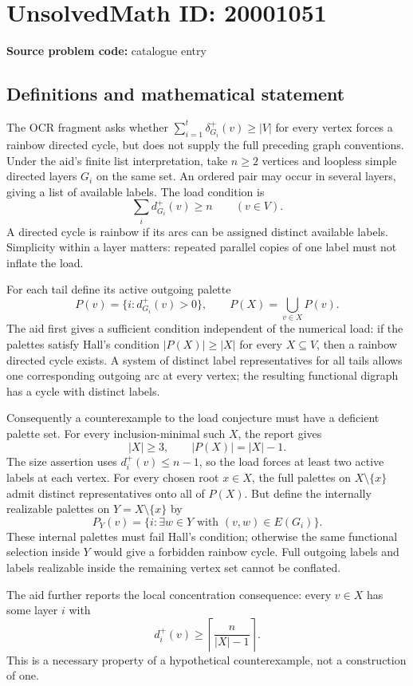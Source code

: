 \documentclass[11pt]{article}
\begin{document}
\section*{UnsolvedMath ID: 20001051}
\textbf{Source problem code:} catalogue entry
\subsection{Definitions and mathematical statement}
The OCR fragment asks whether $\sum_{i=1}^t\delta^+_{G_i}(v)\geq|V|$ for every vertex forces a rainbow directed cycle, but does not supply the full preceding graph conventions. Under the aid's finite list interpretation, take $n\geq2$ vertices and loopless simple directed layers $G_i$ on the same set. An ordered pair may occur in several layers, giving a list of available labels. The load condition is
\[
 \sum_i d^+_{G_i}(v)\geq n\qquad(v\in V).
\]
A directed cycle is rainbow if its arcs can be assigned distinct available labels. Simplicity within a layer matters: repeated parallel copies of one label must not inflate the load.

For each tail define its active outgoing palette
\[
 P(v)=\{i:d^+_{G_i}(v)>0\},\qquad P(X)=\bigcup_{v\in X}P(v).
\]
The aid first gives a sufficient condition independent of the numerical load: if the palettes satisfy Hall's condition $|P(X)|\geq|X|$ for every $X\subseteq V$, then a rainbow directed cycle exists. A system of distinct label representatives for all tails allows one corresponding outgoing arc at every vertex; the resulting functional digraph has a cycle with distinct labels.

Consequently a counterexample to the load conjecture must have a deficient palette set. For every inclusion-minimal such $X$, the report gives
\[
 |X|\geq3,\qquad |P(X)|=|X|-1.
\]
The size assertion uses $d_i^+(v)\leq n-1$, so the load forces at least two active labels at each vertex. For every chosen root $x\in X$, the full palettes on $X\setminus\{x\}$ admit distinct representatives onto all of $P(X)$. But define the internally realizable palettes on $Y=X\setminus\{x\}$ by
\[
 P_Y(v)=\{i:\exists w\in Y\text{ with }(v,w)\in E(G_i)\}.
\]
These internal palettes must fail Hall's condition; otherwise the same functional selection inside $Y$ would give a forbidden rainbow cycle. Full outgoing labels and labels realizable inside the remaining vertex set cannot be conflated.

The aid further reports the local concentration consequence: every $v\in X$ has some layer $i$ with
\[
 d_i^+(v)\geq\left\lceil\frac n{|X|-1}\right\rceil.
\]
This is a necessary property of a hypothetical counterexample, not a construction of one.
\end{document}
